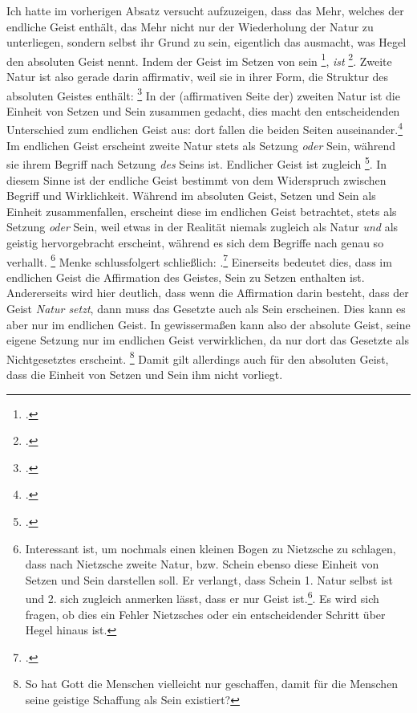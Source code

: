 \documentclass[12pt, a4paper, openany]{report}
\begin{document}
Ich hatte im vorherigen Absatz versucht aufzuzeigen, dass das Mehr, welches der endliche Geist enthält, das Mehr nicht nur der Wiederholung der Natur zu unterliegen, sondern selbst ihr Grund zu sein, eigentlich das ausmacht, was Hegel den absoluten Geist nennt.
Indem der Geist im Setzen von sein \footcite[][§ 384, S. 29]{hegel_enzyklopädie_1969}, \emph{ist} \footcite[][144]{menke_autonomie_2018}.
Zweite Natur ist also gerade darin affirmativ, weil sie in ihrer Form, die Struktur des absoluten Geistes enthält: 
\footcite[][§ 384, S. 29]{hegel_enzyklopädie_1969}
In der (affirmativen Seite der) zweiten Natur ist die Einheit von Setzen und Sein zusammen gedacht, dies macht den entscheidenden Unterschied zum endlichen Geist aus: 
dort fallen die beiden Seiten auseinander.\footcite[Vgl.][S. 143 - S. 144]{menke_autonomie_2018}
Im endlichen Geist erscheint zweite Natur stets als Setzung \emph{oder} Sein, während sie ihrem Begriff nach Setzung \emph{des} Seins ist. 
Endlicher Geist ist zugleich \footcite[][144]{menke_autonomie_2018}.
In diesem Sinne ist der endliche Geist bestimmt von dem Widerspruch zwischen Begriff und Wirklichkeit. 
Während im absoluten Geist, Setzen und Sein als Einheit zusammenfallen, erscheint diese im endlichen Geist betrachtet, stets als Setzung \emph{oder} Sein, weil etwas in der Realität niemals zugleich als Natur \emph{und} als geistig hervorgebracht erscheint, während es sich dem Begriffe nach genau so verhallt.
\footnote{
    Interessant ist, um nochmals einen kleinen Bogen zu Nietzsche zu schlagen, dass nach Nietzsche zweite Natur, bzw. Schein ebenso diese Einheit von Setzen und Sein darstellen soll.
    Er verlangt, dass Schein 1. Natur selbst ist und 2. sich zugleich anmerken lässt, dass er nur Geist ist.\footcite[Vgl.][§ 54, S. 417]{nietzsche_morgenrote_1999}. 
    Es wird sich fragen, ob dies ein Fehler Nietzsches oder ein entscheidender Schritt über Hegel hinaus ist.
}
Menke schlussfolgert schließlich: 
.\footcite[][144]{menke_autonomie_2018}
Einerseits bedeutet dies, dass im endlichen Geist die Affirmation des Geistes, Sein zu Setzen enthalten ist.
Andererseits wird hier deutlich, dass wenn die Affirmation darin besteht, dass der Geist \emph{Natur setzt}, dann muss das Gesetzte auch als Sein erscheinen.
Dies kann es aber nur im endlichen Geist.
In gewissermaßen kann also der absolute Geist, seine eigene Setzung nur im endlichen Geist verwirklichen, da  nur dort das Gesetzte als Nichtgesetztes erscheint.
\footnote{
    So hat Gott die Menschen vielleicht nur geschaffen, damit für die Menschen seine geistige Schaffung als Sein existiert?
}
Damit gilt allerdings auch für den absoluten Geist, dass die Einheit von Setzen und Sein ihm nicht vorliegt.
\end{document}

